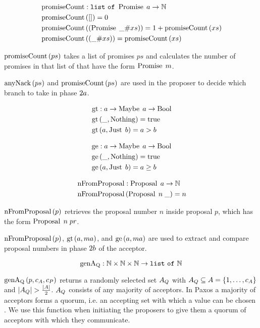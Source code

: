\begin{align*}
&\operatorname{promiseCount} : \mathtt{list\ of\ } \operatorname{Promise}\; a \to \mathbb{N}\\
&\operatorname{promiseCount}\left(\mathtt{[]}\right) = 0\\
&\operatorname{promiseCount}\left(\left(\operatorname{Promise}\; \mathtt{\_} \mathtt{\#} xs\right)\right) = 1 + \operatorname{promiseCount}\left(xs\right)\\
&\operatorname{promiseCount}\left(\left(\mathtt{\_} \mathtt{\#} xs\right)\right) = \operatorname{promiseCount}\left(xs\right)
\end{align*}

$\operatorname{promiseCount}\left(ps\right)$ takes a list of promises $ps$ and calculates the number of promises in that list of that have the form $\operatorname{Promise}\; m$.

$\operatorname{anyNack}\left(ps\right)$ and $\operatorname{promiseCount}\left(ps\right)$ are used in the proposer to decide which branch to take in phase $2a$.

\begin{align*}    
&\operatorname{gt} : a \to \operatorname{Maybe}\; a \to \operatorname{Bool}\\
&\operatorname{gt}\left(\mathtt{\_}, \operatorname{Nothing}\right) = \operatorname{true}\\
&\operatorname{gt}\left(a, \operatorname{Just}\; b\right) = a > b
\end{align*}

\begin{align*}
&\operatorname{ge} : a \to \operatorname{Maybe}\; a \to \operatorname{Bool}\\
&\operatorname{ge}\left(\mathtt{\_}, \operatorname{Nothing}\right) = \operatorname{true}\\
&\operatorname{ge}\left(a, \operatorname{Just}\; b\right) = a \ge b
\end{align*}

\begin{align*}    
&\operatorname{nFromProposal} : \operatorname{Proposal}\; a \to \mathbb{N}\\
&\operatorname{nFromProposal}\left(\operatorname{Proposal}\; n\; \mathtt{\_} \right) = n
\end{align*}

$\operatorname{nFromProposal}\left(p \right)$ retrieves the proposal number $n$ inside proposal $p$, which has the form $\operatorname{Proposal}\; n\; pr$.

$\operatorname{nFromProposal}\left(p \right)$, $\operatorname{gt}\left(a, ma\right)$, and $\operatorname{ge}\left(a, ma\right)$ are used to extract and compare proposal numbers in phase $2b$ of the acceptor.

\[\operatorname{genA_Q} : \mathbb{N} \times \mathbb{N} \times \mathbb{N} \to \mathtt{list\ of\ } \mathbb{N}\]

$\operatorname{genA_Q}\left(p, c_A, c_P\right)$ returns a randomly selected set $A_Q$ with $A_Q \subseteq A = \left\{1, \dots, c_A\right\}$ and $|A_Q| > \frac{|A|}{2}$.
$A_Q$ consists of any majority of acceptors.
In Paxos a majority of acceptors forms a quorum, i.e. an accepting set with which a value can be chosen \cite{Lamport06}.
We use this function when initiating the proposers to give them a quorum of acceptors with which they communicate.

